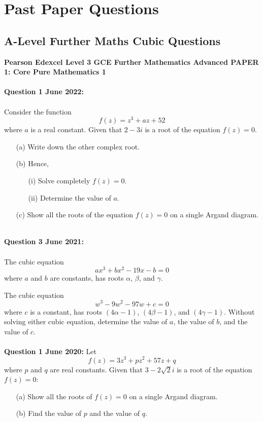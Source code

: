 \documentclass[12pt]{article}
\begin{document}
\section{Past Paper Questions}

\subsection{A-Level Further Maths Cubic Questions}
\textbf{Pearson Edexcel Level 3 GCE Further Mathematics
Advanced PAPER 1: Core Pure Mathematics 1}\\\\
\textbf{Question 1 June 2022:}\\\\
Consider the function 
\[f(z) = z^3 + az + 52\]
where \( a \) is a real constant. Given that \( 2 - 3i \) is a root of the equation \( f(z) = 0 \).
\begin{enumerate}
    \item[(a)] Write down the other complex root.
    \item[(b)] Hence,
    \begin{enumerate}
        \item[(i)] Solve completely \( f(z) = 0 \).
        \item[(ii)] Determine the value of \( a \).
    \end{enumerate}
    \item[(c)] Show all the roots of the equation \( f(z) = 0 \) on a single Argand diagram.\\\\
\end{enumerate}

\textbf{Question 3 June 2021:}\\\\
The cubic equation
\[ax^3 + bx^2 - 19x - b = 0\]
where \( a \) and \( b \) are constants, has roots \( \alpha \), \( \beta \), and \( \gamma \).

The cubic equation
\[w^3 - 9w^2 - 97w + c = 0\]
where \( c \) is a constant, has roots \( (4\alpha - 1) \), \( (4\beta - 1) \), and \( (4\gamma - 1) \).
Without solving either cubic equation, determine the value of \( a \), the value of \( b \), and the value of \( c \).\\\\

\textbf{Question 1 June 2020:}
Let 
\[f(z) = 3z^3 + pz^2 + 57z + q\]
where \( p \) and \( q \) are real constants. Given that \( 3 - 2\sqrt{2}i \) is a root of the equation \( f(z) = 0 \):
\begin{enumerate}
    \item[(a)] Show all the roots of \( f(z) = 0 \) on a single Argand diagram.    
    \item[(b)] Find the value of \( p \) and the value of \( q \).\\\\
\end{enumerate}
\end{document}

